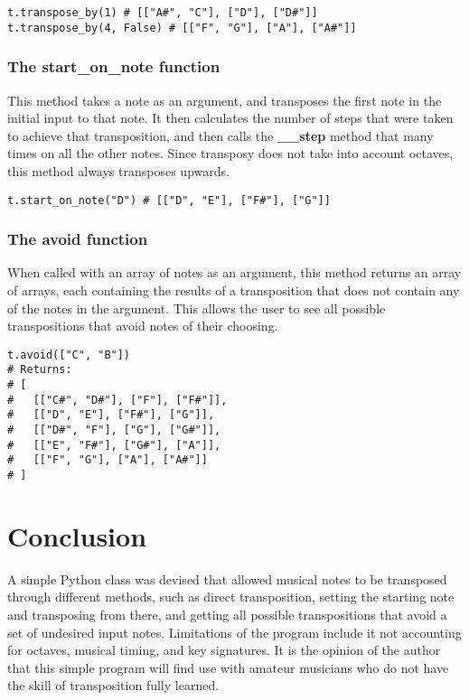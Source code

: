 \documentclass[11pt, a4paper]{article}
\begin{document}
		\begin{lstlisting}
t.transpose_by(1) # [["A#", "C"], ["D"], ["D#"]]
t.transpose_by(4, False) # [["F", "G"], ["A"], ["A#"]]
		\end{lstlisting}

	\subsubsection{The start\_on\_note function}
		This method takes a note as an argument, and transposes the first note in the initial input to that note. It then calculates the number of steps that were taken to achieve that transposition, and then calls the \textbf{\_\_step} method that many times on all the other notes. Since transposy does not take into account octaves, this method always transposes upwards.

		\begin{lstlisting}
t.start_on_note("D") # [["D", "E"], ["F#"], ["G"]]
		\end{lstlisting}

	\subsubsection{The avoid function}
		When called with an array of notes as an argument, this method returns an array of arrays, each containing the results of a transposition that does not contain any of the notes in the argument. This allows the user to see all possible transpositions that avoid notes of their choosing.

		\begin{lstlisting}
t.avoid(["C", "B"])
# Returns:
# [	
#	[["C#", "D#"], ["F"], ["F#"]],
#	[["D", "E"], ["F#"], ["G"]],
#	[["D#", "F"], ["G"], ["G#"]],
#	[["E", "F#"], ["G#"], ["A"]],
#	[["F", "G"], ["A"], ["A#"]]
# ]
	\end{lstlisting}

	\section{Conclusion}
		A simple Python class was devised that allowed musical notes to be transposed through different methods, such as direct transposition, setting the starting note and transposing from there, and getting all possible transpositions that avoid a set of undesired input notes.
		Limitations of the program include it not accounting for octaves, musical timing, and key signatures. It is the opinion of the author that this simple program will find use with amateur musicians who do not have the skill of transposition fully learned.
\end{document}
